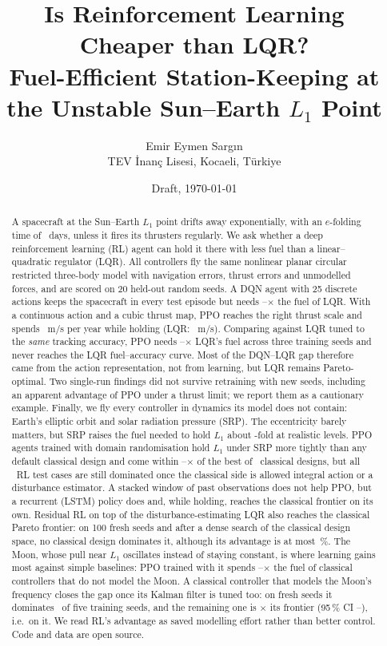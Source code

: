 \documentclass[11pt,a4paper]{article}
\title{Is Reinforcement Learning Cheaper than LQR?\\[0.3em]
\large Fuel-Efficient Station-Keeping at the Unstable Sun--Earth $L_1$ Point}
\author{Emir Eymen Sarg\i n\\
\small TEV \.{I}nan\c{c} Lisesi, Kocaeli, T\"urkiye}
\date{Draft, \today}
\begin{document}
\maketitle

\begin{abstract}
A spacecraft at the Sun--Earth $L_1$ point drifts away exponentially, with an
$e$-folding time of \efoldDays~days, unless it fires its thrusters regularly.
We ask whether a deep reinforcement learning (RL) agent can hold it there with
less fuel than a linear--quadratic regulator (LQR). All controllers fly the same
nonlinear planar circular restricted three-body model with navigation errors,
thrust errors and unmodelled forces, and are scored on 20 held-out random
seeds. A DQN agent with 25 discrete actions keeps the spacecraft in every test
episode but needs \dqnRatioMin--\dqnRatioMax$\times$ the fuel of LQR. With a
continuous action and a cubic thrust map, PPO reaches the right thrust scale and
spends \cubHoldDv~m/s per year while holding (LQR: \lqrHoldDv~m/s). Comparing
against LQR tuned to the \emph{same} tracking accuracy, PPO needs
\cubRatioMin--\cubRatioMax$\times$ LQR's fuel across three training seeds and
never reaches the LQR fuel--accuracy curve. Most of the DQN--LQR gap therefore
came from the action representation, not from learning, but LQR remains
Pareto-optimal. Two single-run findings did not survive retraining with new
seeds, including an apparent advantage of PPO under a thrust limit; we report
them as a cautionary example. Finally, we fly every controller in dynamics its
model does not contain: Earth's elliptic orbit and solar radiation pressure
(SRP). The eccentricity barely matters, but SRP raises the fuel needed to hold
$L_1$ about \mmDvGrowthKone-fold at realistic levels. PPO agents trained with
domain randomisation hold $L_1$ under SRP more tightly than any default classical design
and come within \mmDrHoldMin--\mmDrHoldMax$\times$ of the best of \mmDesigns\
classical designs, but all \mmRlRuns\ RL test cases are still dominated once the
classical side is allowed integral action or a disturbance estimator. A
stacked window of past observations does not help PPO, but a recurrent (LSTM)
policy does and, while holding, reaches the classical frontier on its own.
Residual RL on top of the
disturbance-estimating LQR also reaches the classical Pareto frontier: on 100 fresh
seeds and after a dense search of the classical design space, no classical
design dominates it, although its advantage is at most \peFsMarginMax\,\%.
The Moon, whose pull near $L_1$ oscillates instead of staying constant, is
where learning gains most against simple baselines: PPO trained with it spends
\kThreeAgnMin--\kThreeAgnMax$\times$ the fuel of classical controllers that do
not model the Moon. A classical controller that models the Moon's frequency
closes the gap once its Kalman filter is tuned too: on fresh seeds it
dominates \kThreeFreshDomWord\ of five training seeds, and the remaining one is
\kThreeBestEnv$\times$ its frontier (95\,\% CI
\kThreeBestLo--\kThreeBestHi), i.e.\ on it. We read RL's advantage as saved
modelling effort rather than better control. Code and data are open source.
\end{abstract}
\end{document}

